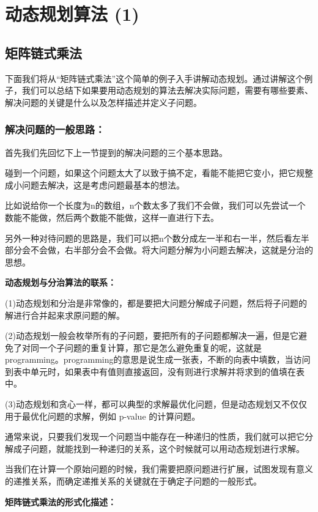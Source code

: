 \chapter{动态规划算法 (1)}

\section{矩阵链式乘法}

下面我们将从“矩阵链式乘法”这个简单的例子入手讲解动态规划。通过讲解这个例子，我们可以总结下如果要用动态规划的算法去解决实际问题，需要有哪些要素、解决问题的关键是什么以及怎样描述并定义子问题。

\subsection{解决问题的一般思路：}

首先我们先回忆下上一节提到的解决问题的三个基本思路。

碰到一个问题，如果这个问题太大了以致于搞不定，看能不能把它变小，把它规整成小问题去解决，这是考虑问题最基本的想法。

比如说给你一个长度为n的数组，n个数太多了我们不会做，我们可以先尝试一个数能不能做，然后两个数能不能做，这样一直进行下去。

另外一种对待问题的思路是，我们可以把n个数分成左一半和右一半，然后看左半部分会不会做，右半部分会不会做。将大问题分解为小问题去解决，这就是分治的思想。

\textbf{动态规划与分治算法的联系：}

(1)动态规划和分治是非常像的，都是要把大问题分解成子问题，然后将子问题的解进行合并起来求原问题的解。

(2)动态规划一般会枚举所有的子问题，要把所有的子问题都解决一遍，但是它避免了对同一个子问题的重复计算，那它是怎么避免重复的呢，这就是programming。programming的意思是说生成一张表，不断的向表中填数，当访问到表中单元时，如果表中有值则直接返回，没有则进行求解并将求到的值填在表中。

(3)动态规划和贪心一样，都可以典型的求解最优化问题，但是动态规划又不仅仅用于最优化问题的求解，例如 p-value 的计算问题。

通常来说，只要我们发现一个问题当中能存在一种递归的性质，我们就可以把它分解成子问题，就能找到一种递归的关系，这个时候就可以用动态规划进行求解。

当我们在计算一个原始问题的时候，我们需要把原问题进行扩展，试图发现有意义的递推关系，而确定递推关系的关键就在于确定子问题的一般形式。

\textbf{矩阵链式乘法的形式化描述：}

